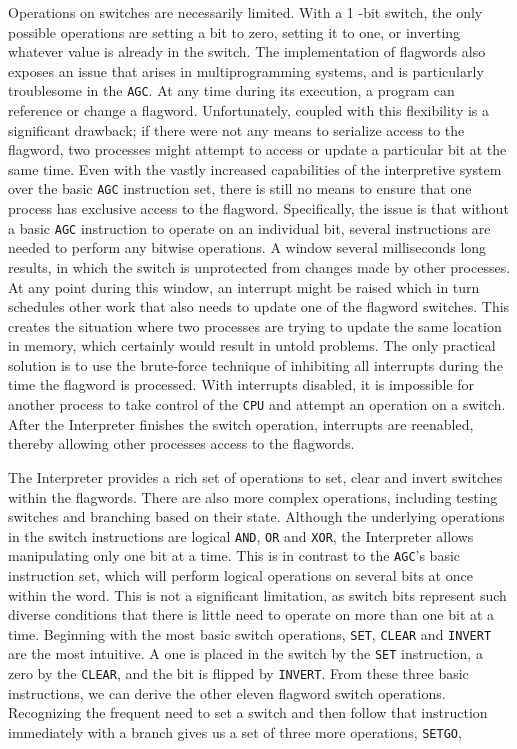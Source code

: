 \documentclass[refcap, oxford]{ahsan}
\begin{document}
Operations on switches are necessarily limited. With a 1 -bit switch, the only possible operations are setting a bit to zero, setting it to one, or inverting whatever value is already in the switch. The implementation of flagwords also exposes an issue that arises in multiprogramming systems, and is particularly troublesome in the \texttt{AGC}. At any time during its execution, a program can reference or change a flagword. Unfortunately, coupled with this flexibility is a significant drawback; if there were not any means to serialize access to the flagword, two processes might attempt to access or update a particular bit at the same time. Even with the vastly increased capabilities of the interpretive system over the basic \texttt{AGC} instruction set, there is still no means to ensure that one process has exclusive access to the flagword. Specifically, the issue is that without a basic \texttt{AGC} instruction to operate on an individual bit, several instructions are needed to perform any bitwise operations. A window several milliseconds long results, in which the switch is unprotected from changes made by other processes. At any point during this window, an interrupt might be raised which in turn schedules other work that also needs to update one of the flagword switches. This creates the situation where two processes are trying to update the same location in memory, which certainly would result in untold problems. The only practical solution is to use the brute-force technique of inhibiting all interrupts during the time the flagword is processed. With interrupts disabled, it is impossible for another process to take control of the \texttt{CPU} and attempt an operation on a switch. After the Interpreter finishes the switch operation, interrupts are reenabled, thereby allowing other processes access to the flagwords.

The Interpreter provides a rich set of operations to set, clear and invert switches within the flagwords. There are also more complex operations, including testing switches and branching based on their state. Although the underlying operations in the switch instructions are logical \texttt{AND}, \texttt{OR} and \texttt{XOR}, the Interpreter allows manipulating only one bit at a time. This is in contrast to the \texttt{AGC}'s basic instruction set, which will perform logical operations on several bits at once within the word. This is not a significant limitation, as switch bits represent such diverse conditions that there is little need to operate on more than one bit at a time. Beginning with the most basic switch operations, \texttt{SET}, \texttt{CLEAR} and \texttt{INVERT} are the most intuitive. A one is placed in the switch by the \texttt{SET} instruction, a zero by the \texttt{CLEAR}, and the bit is flipped by \texttt{INVERT}. From these three basic instructions, we can derive the other eleven flagword switch operations. Recognizing the frequent need to set a switch and then follow that instruction immediately with a branch gives us a set of three more operations, \texttt{SETGO},
\end{document}
